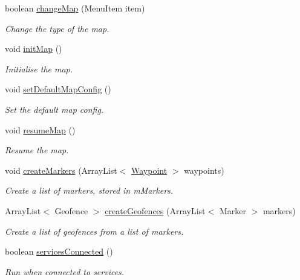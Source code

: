 \begin{DoxyCompactItemize}
boolean \hyperlink{classuk_1_1ac_1_1swan_1_1digitaltrails_1_1activities_1_1_map_activity_abce8f3f496dba8c6021c7a3bb474d30b}{change\+Map} (Menu\+Item item)
\begin{DoxyCompactList}\small\item\em Change the type of the map. \end{DoxyCompactList}\item 
void \hyperlink{classuk_1_1ac_1_1swan_1_1digitaltrails_1_1activities_1_1_map_activity_a306798cff2d5e91a7179ee13599992b9}{init\+Map} ()
\begin{DoxyCompactList}\small\item\em Initialise the map. \end{DoxyCompactList}\item 
void \hyperlink{classuk_1_1ac_1_1swan_1_1digitaltrails_1_1activities_1_1_map_activity_a33f06d07798f02e0c54d180affd49363}{set\+Default\+Map\+Config} ()
\begin{DoxyCompactList}\small\item\em Set the default map config. \end{DoxyCompactList}\item 
void \hyperlink{classuk_1_1ac_1_1swan_1_1digitaltrails_1_1activities_1_1_map_activity_ac236d26f1c92c9d5a2e70867871128b4}{resume\+Map} ()
\begin{DoxyCompactList}\small\item\em Resume the map. \end{DoxyCompactList}\item 
void \hyperlink{classuk_1_1ac_1_1swan_1_1digitaltrails_1_1activities_1_1_map_activity_a2d49a3077eb36dc26503c523bb79266a}{create\+Markers} (Array\+List$<$ \hyperlink{classuk_1_1ac_1_1swan_1_1digitaltrails_1_1components_1_1_waypoint}{Waypoint} $>$ waypoints)
\begin{DoxyCompactList}\small\item\em Create a list of markers, stored in m\+Markers. \end{DoxyCompactList}\item 
Array\+List$<$ Geofence $>$ \hyperlink{classuk_1_1ac_1_1swan_1_1digitaltrails_1_1activities_1_1_map_activity_a91ce9508e98b08619d3433769f5caa81}{create\+Geofences} (Array\+List$<$ Marker $>$ markers)
\begin{DoxyCompactList}\small\item\em Create a list of geofences from a list of markers. \end{DoxyCompactList}\item 
boolean \hyperlink{classuk_1_1ac_1_1swan_1_1digitaltrails_1_1activities_1_1_map_activity_a13417bbaf308c102245f1770554a706b}{services\+Connected} ()
\begin{DoxyCompactList}\small\item\em Run when connected to services. \end{DoxyCompactList}\end{DoxyCompactItemize}
